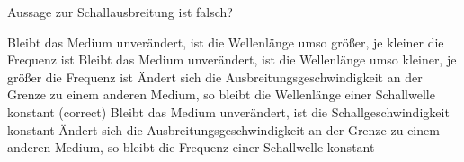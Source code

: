 \documentclass[11pt]{exam}
\begin{document}
\begin{questions}
\vspace{3mm}\question Aussage zur Schallausbreitung ist falsch?

\begin{choices}
	\choice Bleibt das Medium unverändert, ist die Wellenlänge umso größer, je kleiner die Frequenz ist
	\choice Bleibt das Medium unverändert, ist die Wellenlänge umso kleiner, je größer die Frequenz ist
	\choice Ändert sich die Ausbreitungsgeschwindigkeit an der Grenze zu einem anderen Medium, so bleibt die Wellenlänge einer Schallwelle konstant (correct)
	\choice Bleibt das Medium unverändert, ist die Schallgeschwindigkeit konstant
	\choice Ändert sich die Ausbreitungsgeschwindigkeit an der Grenze zu einem anderen Medium, so bleibt die Frequenz einer Schallwelle konstant
\end{choices}

\vspace{3mm}\end{questions}
\end{document}
